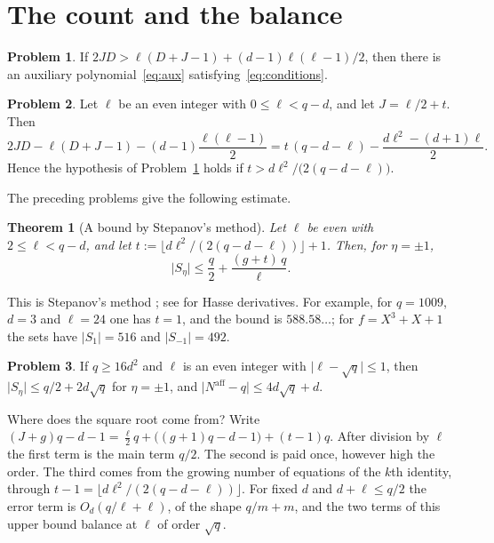 \documentclass[reqno]{amsart}
\theoremstyle{definition}
\newtheorem{problem}{Problem}[section]
\theoremstyle{plain}
\newtheorem{theorem}{Theorem}[section]
\newcommand{\Naff}{N^{\mathrm{aff}}}
\begin{document}
\section{The count and the balance}\label{sec:count}

\begin{problem}\label{pr:siegel}
If \(2JD > \ell(D + J - 1) + (d-1)\ell(\ell-1)/2\), then there is an auxiliary polynomial~\eqref{eq:aux} satisfying~\eqref{eq:conditions}.
\end{problem}

\begin{problem}\label{pr:choiceJ}
Let \(\ell\) be an even integer with \(0 \le \ell < q - d\), and let \(J = \ell/2 + t\).  Then
\[
  2JD - \ell(D + J - 1) - (d-1)\frac{\ell(\ell-1)}{2} = t\,(q - d - \ell) - \frac{d\ell^2 - (d+1)\ell}{2} .
\]
Hence the hypothesis of Problem~\ref{pr:siegel} holds if \(t > d\ell^2/\bigl(2(q - d - \ell)\bigr)\).
\end{problem}

The preceding problems give the following estimate.

\begin{theorem}[A bound by Stepanov's method]\label{thm:stepanov}
Let \(\ell\) be even with \(2 \le \ell < q - d\), and let \(t := \lfloor d\ell^2/(2(q - d - \ell)) \rfloor + 1\).  Then, for \(\eta = \pm 1\),
\[
  \lvert S_\eta \rvert \le \frac{q}{2} + \frac{(g + t)\, q}{\ell} .
\]
\end{theorem}

This is Stepanov's method \cite{Ste69}; see \cite{Sch76} for Hasse derivatives.  For example, for \(q = 1009\), \(d = 3\) and \(\ell = 24\) one has \(t = 1\), and the bound is \(588.58\ldots\); for \(f = X^3 + X + 1\) the sets have \(\lvert S_1 \rvert = 516\) and \(\lvert S_{-1} \rvert = 492\).

\begin{problem}\label{pr:sqrtq}
If \(q \ge 16d^2\) and \(\ell\) is an even integer with \(\lvert \ell - \sqrt q \rvert \le 1\), then \(\lvert S_\eta \rvert \le q/2 + 2d\sqrt q\) for \(\eta = \pm 1\), and \(\lvert \Naff - q \rvert \le 4d\sqrt q + d\).
\end{problem}

Where does the square root come from?  Write \((J + g)q - d - 1 = \frac{\ell}{2} q + \bigl((g+1)q - d - 1\bigr) + (t - 1) q\).  After division by \(\ell\) the first term is the main term \(q/2\).  The second is paid once, however high the order.  The third comes from the growing number of equations of the \(k\)th identity, through \(t - 1 = \lfloor d\ell^2/(2(q - d - \ell)) \rfloor\).  For fixed \(d\) and \(d + \ell \le q/2\) the error term is \(O_d(q/\ell + \ell)\), of the shape \(q/m + m\), and the two terms of this upper bound balance at \(\ell\) of order \(\sqrt q\).
\end{document}
